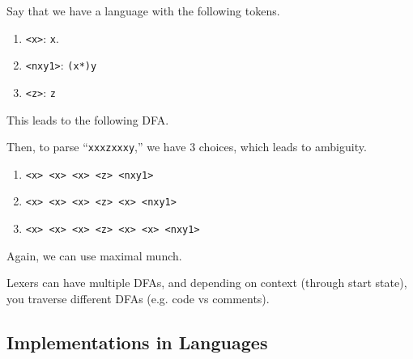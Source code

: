   \begin{example}
    Say that we have a language with the following tokens. 
    \begin{enumerate}
      \item \texttt{<x>}: \texttt{x}. 
      \item \texttt{<nxy1>}: \texttt{(x*)y} 
      \item \texttt{<z>}: \texttt{z}
    \end{enumerate}
    This leads to the following DFA. 

    \begin{figure}[H]
      \centering 
      \caption{} 
      \label{fig:dfa3choice}
    \end{figure}

    Then, to parse ``\texttt{xxxzxxxy},'' we have 3 choices, which leads to ambiguity. 
    \begin{enumerate}
      \item \texttt{<x> <x> <x> <z> <nxy1>}
      \item \texttt{<x> <x> <x> <z> <x> <nxy1>}
      \item \texttt{<x> <x> <x> <z> <x> <x> <nxy1>}
    \end{enumerate}
    Again, we can use maximal munch.  
  \end{example}

  Lexers can have multiple DFAs, and depending on context (through start state), you traverse different DFAs (e.g. code vs comments). 

\subsection{Implementations in Languages} 


